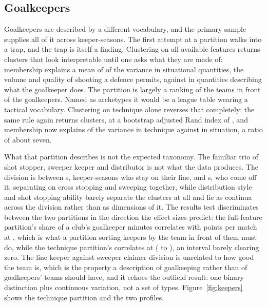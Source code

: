 

\subsection{Goalkeepers}
\label{sec:results:keepers}

Goalkeepers are described by a different vocabulary, and the primary sample supplies all of it
across \ArcKeeperSeasons{} keeper-seasons. The first attempt at a partition walks into a trap, and
the trap is itself a finding. Clustering on all available features returns \ArcKeeperK{} clusters
that look interpretable until one asks what they are made of: membership explains a mean of
\ArcKeeperEtaFullSituation{} of the variance in situational quantities, the volume and quality of
shooting a defence permits, against \ArcKeeperEtaFullTechnique{} in quantities describing what the
goalkeeper does. The partition is largely a ranking of the teams in front of the goalkeepers.
Named as archetypes it would be a league table wearing a tactical vocabulary. Clustering on
technique alone reverses that completely: the same rule again returns \ArcKeeperK{} clusters, at a
bootstrap adjusted Rand index of \ArcKeeperBootARI{}, and membership now explains
\ArcKeeperEtaTechTechnique{} of the variance in technique against \ArcKeeperEtaTechSituation{} in
situation, a ratio of about seven.

What that partition describes is not the expected taxonomy. The familiar trio of shot stopper,
sweeper keeper and distributor is not what the data produces. The division is between
\ArcKeeperNameZero{}s, \ArcKeeperNZero{} keeper-seasons who stay on their line, and
\ArcKeeperNameOne{}s, \ArcKeeperNOne{} who come off it, separating on cross stopping and sweeping
together, while distribution style and shot stopping ability barely separate the clusters at all
and lie as continua across the division rather than as dimensions of it. The results test
discriminates between the two partitions in the direction the effect sizes predict: the
full-feature partition's share of a club's goalkeeper minutes correlates with points per match at
\OutKeepFull{}, which is what a partition sorting keepers by the team in front of them must do,
while the technique partition's correlates at \OutKeepTech{} (\OutKeepTechLow{} to
\OutKeepTechHigh{}), an interval barely clearing zero. The line keeper against sweeper claimer
division is unrelated to how good the team is, which is the property a description of goalkeeping
rather than of goalkeepers' teams should have, and it echoes the outfield result: one binary
distinction plus continuous variation, not a set of types.
Figure~\ref{fig:keepers} shows the technique partition and the two profiles.

